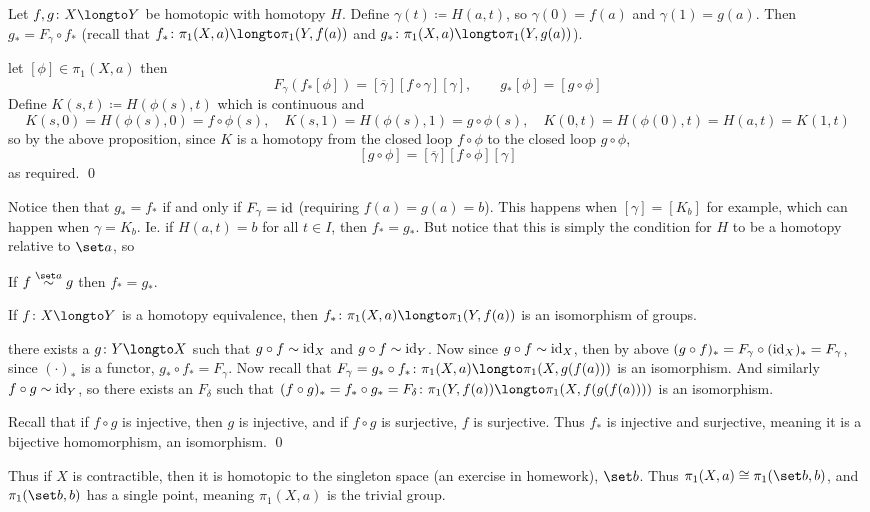     Let $f,g\colon X\longto Y$ be homotopic with homotopy $H$.
    Define $\gamma(t)\coloneqq H(a,t)$, so $\gamma(0)=f(a)$ and $\gamma(1)=g(a)$.
    Then $g_*=F_\gamma\circ f_*$ (recall that $f_*\colon\pi_1(X,a)\longto\pi_1(Y,f(a))$ and $g_*\colon\pi_1(X,a)\longto\pi_1(Y,g(a))$).

\ethrm

\Proof let $[\phi]\in\pi_1(X,a)$ then
$$ F_\gamma(f_*[\phi]) = [\overline\gamma][f\circ\gamma][\gamma],\qquad g_*[\phi] = [g\circ\phi] $$
Define $K(s,t)\coloneqq H(\phi(s),t)$ which is continuous and
$$ K(s,0) = H(\phi(s),0) = f\circ\phi(s),\quad K(s,1) = H(\phi(s),1) = g\circ\phi(s),\quad K(0,t) = H(\phi(0),t) = H(a,t) = K(1,t) $$
so by the above proposition, since $K$ is a homotopy from the closed loop $f\circ\phi$ to the closed loop $g\circ\phi$,
$$ [g\circ\phi] = [\overline\gamma][f\circ\phi][\gamma] $$
as required.
\qed

Notice then that $g_*=f_*$ if and only if $F_\gamma={\rm id}$ (requiring $f(a)=g(a)=b$).
This happens when $[\gamma]=[K_b]$ for example, which can happen when $\gamma=K_b$.
Ie. if $H(a,t)=b$ for all $t\in I$, then $f_*=g_*$.
But notice that this is simply the condition for $H$ to be a homotopy relative to $\set a$, so

\bprop

    If $f\htopic{\set a}g$ then $f_*=g_*$.

\eprop

\bthrm

    If $f\colon X\longto Y$ is a homotopy equivalence, then $f_*\colon\pi_1(X,a)\longto\pi_1(Y,f(a))$ is an isomorphism of groups.

\ethrm

\Proof there exists a $g\colon Y\longto X$ such that $g\circ f\sim{\rm id}_X$ and $g\circ f\sim{\rm id}_Y$.
Now since $g\circ f\sim{\rm id}_X$, then by above $(g\circ f)_*=F_\gamma\circ({\rm id}_X)_*=F_\gamma$, since ${(\cdot)}_*$ is a functor, $g_*\circ f_*=F_\gamma$.
Now recall that $F_\gamma=g_*\circ f_*\colon\pi_1(X,a)\longto\pi_1(X,g(f(a)))$ is an isomorphism.
And similarly $f\circ g\sim{\rm id}_Y$, so there exists an $F_\delta$ such that $(f\circ g)_*=f_*\circ g_*=F_\delta\colon\pi_1(Y,f(a))\longto\pi_1(X,f(g(f(a))))$ is an isomorphism.

Recall that if $f\circ g$ is injective, then $g$ is injective, and if $f\circ g$ is surjective, $f$ is surjective.
Thus $f_*$ is injective and surjective, meaning it is a bijective homomorphism, an isomorphism.
\qed

Thus if $X$ is contractible, then it is homotopic to the singleton space (an exercise in homework), $\set b$.
Thus $\pi_1(X,a)\cong\pi_1(\set b,b)$, and $\pi_1(\set b,b)$ has a single point, meaning $\pi_1(X,a)$ is the trivial group.

